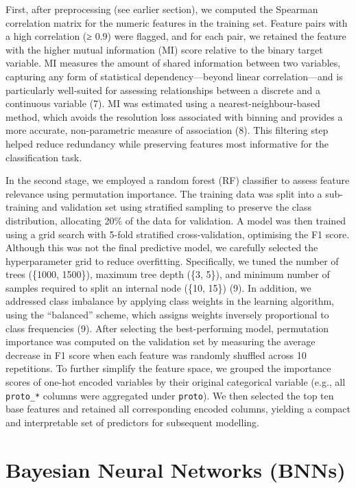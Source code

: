 \documentclass[
  a4paper,
]{scrreprt}
\begin{document}
First, after preprocessing (see earlier section), we computed the
Spearman correlation matrix for the numeric features in the training
set. Feature pairs with a high correlation (≥ 0.9) were flagged, and for
each pair, we retained the feature with the higher mutual information
(MI) score relative to the binary target variable. MI measures the
amount of shared information between two variables, capturing any form
of statistical dependency---beyond linear correlation---and is
particularly well-suited for assessing relationships between a discrete
and a continuous variable (7). MI was estimated using a
nearest-neighbour-based method, which avoids the resolution loss
associated with binning and provides a more accurate, non-parametric
measure of association (8). This filtering step helped reduce redundancy
while preserving features most informative for the classification task.

In the second stage, we employed a random forest (RF) classifier to
assess feature relevance using permutation importance. The training data
was split into a sub-training and validation set using stratified
sampling to preserve the class distribution, allocating 20\% of the data
for validation. A model was then trained using a grid search with 5-fold
stratified cross-validation, optimising the F1 score. Although this was
not the final predictive model, we carefully selected the hyperparameter
grid to reduce overfitting. Specifically, we tuned the number of trees
(\{1000, 1500\}), maximum tree depth (\{3, 5\}), and minimum number of
samples required to split an internal node (\{10, 15\}) (9). In
addition, we addressed class imbalance by applying class weights in the
learning algorithm, using the ``balanced'' scheme, which assigns weights
inversely proportional to class frequencies (9). After selecting the
best-performing model, permutation importance was computed on the
validation set by measuring the average decrease in F1 score when each
feature was randomly shuffled across 10 repetitions. To further simplify
the feature space, we grouped the importance scores of one-hot encoded
variables by their original categorical variable (e.g., all
\texttt{proto\_*} columns were aggregated under \texttt{proto}). We then
selected the top ten base features and retained all corresponding
encoded columns, yielding a compact and interpretable set of predictors
for subsequent modelling.

\section{Bayesian Neural Networks
(BNNs)}\label{bayesian-neural-networks-bnns}
\end{document}
